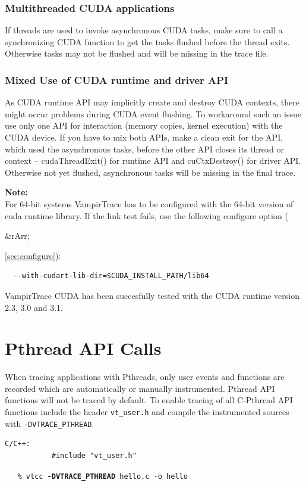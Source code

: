 \documentclass[a4paper,twoside,12pt,BCOR12mm]{scrbook}
\newcommand{\rarr}{$\Rightarrow$}  %
\renewcommand{\rarr}{\begin{rawhtml}&rArr;\end{rawhtml}}   %
\begin{document}
  \subsubsection*{Multithreaded CUDA applications}
  If threads are used to invoke asynchronous CUDA tasks, make sure to call a 
  synchronizing CUDA function to get the tasks flushed before the thread exits. 
  Otherwise tasks may not be flushed and will be missing in the trace file.\medskip\\

  \subsubsection*{Mixed Use of CUDA runtime and driver API}
  As CUDA runtime API may implicitly create and destroy CUDA contexts, there 
  might occur problems during CUDA event flushing. To workaround such an issue 
  use only one API for interaction (memory copies, kernel execution) with the 
  CUDA device. If you have to mix both APIs, make a clean exit for the API, 
  which used the asynchronous tasks, before the other API closes its thread or 
  context -- cudaThreadExit() for runtime API and cuCtxDestroy() for driver API. 
  Otherwise not yet flushed, asynchronous tasks will be missing in the final trace.

  \noindent\textbf{Note:}\\
  For 64-bit systems VampirTrace has to be configured with the 64-bit 
  version of cuda runtime library. If the link test fails, use the 
  following configure option (\rarr\ref{sec:configure}):
  \begin{small}\begin{verbatim}
  --with-cudart-lib-dir=$CUDA_INSTALL_PATH/lib64         
  \end{verbatim}\end{small}

  \noindent VampirTrace CUDA has been succesfully tested with the CUDA runtime version 
  2.3, 3.0 and 3.1. 

\section{Pthread API Calls}
\label{sec:pthread_calls}
  When tracing applications with Pthreads, only user events and 
  functions are recorded which are automatically or manually instrumented. 
  Pthread API functions will not be traced by default.\newline
  To enable tracing of all C-Pthread API functions include the header
  \texttt{vt\_user.h} and compile the instrumented sources with 
  \texttt{-DVTRACE\_PTHREAD}. 
\begin{verbatim}
C/C++:
           #include "vt_user.h"
\end{verbatim}
\vspace{1ex}
\verb|   % vtcc |\texttt{\textbf{-DVTRACE\_PTHREAD}}\verb| hello.c -o hello|
\vspace{1ex}\\
\end{document}
